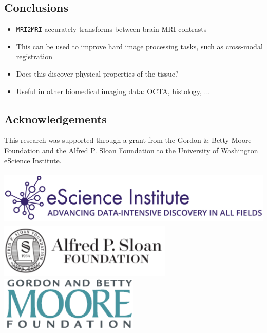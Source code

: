 \documentclass[a0, landscape]{a0poster}
\begin{document}
\begin{multicols}{3}
\section*{Conclusions}
\large
\begin{itemize}

\item \texttt{MRI2MRI} accurately transforms between brain MRI contrasts

\item This can be used to improve hard image processing tasks, such as cross-modal registration

\item Does this discover physical properties of the tissue?

\item Useful in other biomedical imaging data: OCTA, histology, ...

\end{itemize}

\color{DarkSlateGray} %


\nocite{*} %
\footnotesize  %

\subsection*{Acknowledgements} \footnotesize This research was supported through
a grant from the Gordon \& Betty Moore Foundation and the Alfred P. Sloan
Foundation to the University of Washington eScience Institute.

\includegraphics[height=2.6cm]{eSciencelogo.png}
\includegraphics[height=2.6cm]{SloanLogo.png}
\includegraphics[height=2.6cm]{MooreFdn.png}


\end{multicols}
\end{document}
